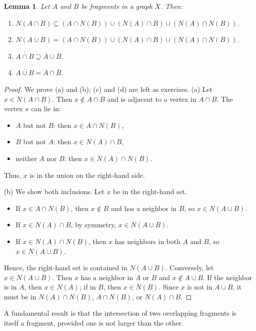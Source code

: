 \documentclass[12pt,a4paper,openany]{book}
\newtheorem{lemma}{Lemma}[section]
\begin{document}
\begin{lemma}\label{lem:fragment-properties}
Let $A$ and $B$ be fragments in a graph $X$. Then:
\begin{enumerate}[label=(\alph*)]
    \item $N(A \cap B) \subseteq (A \cap N(B)) \cup (N(A) \cap B) \cup (N(A) \cap N(B))$.
    \item $N(A \cup B) = (A \cap N(B)) \cup (N(A) \cap B) \cup (N(A) \cap N(B))$.
    \item $\overline{A \cap B} \supseteq \overline{A} \cup \overline{B}$.
    \item $\overline{A \cup B} = \overline{A} \cap \overline{B}$.
\end{enumerate}
\end{lemma}
\begin{proof}
We prove (a) and (b); (c) and (d) are left as exercises.
(a) Let $x \in N(A \cap B)$. Then $x \notin A \cap B$ and is adjacent to a vertex in $A \cap B$. The vertex $x$ can lie in:
\begin{itemize}
    \item $A$ but not $B$: then $x \in A \cap N(B)$,
    \item $B$ but not $A$: then $x \in N(A) \cap B$,
    \item neither $A$ nor $B$: then $x \in N(A) \cap N(B)$.
\end{itemize}
Thus, $x$ is in the union on the right-hand side.

(b) We show both inclusions. Let $x$ be in the right-hand set.
\begin{itemize}
    \item If $x \in A \cap N(B)$, then $x \notin B$ and has a neighbor in $B$, so $x \in N(A \cup B)$.
    \item If $x \in N(A) \cap B$, by symmetry, $x \in N(A \cup B)$.
    \item If $x \in N(A) \cap N(B)$, then $x$ has neighbors in both $A$ and $B$, so $x \in N(A \cup B)$.
\end{itemize}
Hence, the right-hand set is contained in $N(A \cup B)$. Conversely, let $x \in N(A \cup B)$. Then $x$ has a neighbor in $A$ or $B$ and $x \notin A \cup B$. If the neighbor is in $A$, then $x \in N(A)$; if in $B$, then $x \in N(B)$. Since $x$ is not in $A \cup B$, it must be in $N(A) \cap N(B)$, $A \cap N(B)$, or $N(A) \cap B$.
\end{proof}

A fundamental result is that the intersection of two overlapping fragments is itself a fragment, provided one is not larger than the other.
\end{document}
